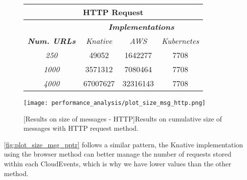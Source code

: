\documentclass[../thesis.tex]{subfiles}
\begin{document}
\vspace*{2cm}

\begin{figure}[H]
    \centering
    \begin{tabular}{|c|c|c|c|}
        \hline
        \multicolumn{4}{|c|}{\textbf{HTTP Request}} \\
        \hline
        & \multicolumn{3}{c|}{\textit{\textbf{Implementations}}} \\
        \hline
        \textit{\textbf{Num. URLs}} & \multicolumn{1}{c|}{\textit{Knative}} & \multicolumn{1}{c|}{\textit{AWS}} & \multicolumn{1}{c|}{\textit{Kubernetes}} \\
        \hline
        \textit{250} & 49052 & 1642277 & 7708 \\
        \hline
        \textit{1000} & 3571312 & 7080464 & 7708 \\
        \hline
        \textit{4000}  & 67007627 & 32316143 & 7708 \\
        \hline
    \end{tabular}
    
    \vspace{\floatsep}

    \texttt{[image: performance\_analysis/plot\_size\_msg\_http.png]}

    [Results on size of messages - HTTP]{Results on cumulative size of messages with \acrshort{HTTP} request method.}\label{fig:plot_size_msg_http}
\end{figure}

\newpage

\autoref{fig:plot_size_msg_pptr} follows a similar pattern, the Knative implementation using the browser method can better manage the number of requests stored within each CloudEvents, which is why we have lower values than the other method.

\vspace*{5cm}
\end{document}
